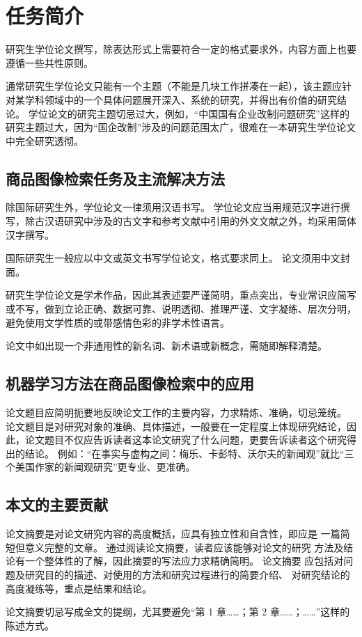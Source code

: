 
\chapter{任务简介}

研究生学位论文撰写，除表达形式上需要符合一定的格式要求外，内容方面上也要遵循一些共性原则。

通常研究生学位论文只能有一个主题（不能是几块工作拼凑在一起），该主题应针对某学科领域中的一个具体问题展开深入、系统的研究，并得出有价值的研究结论。
学位论文的研究主题切忌过大，例如，“中国国有企业改制问题研究”这样的研究主题过大，因为“国企改制”涉及的问题范围太广，很难在一本研究生学位论文中完全研究透彻。



\section{商品图像检索任务及主流解决方法}

除国际研究生外，学位论文一律须用汉语书写。
学位论文应当用规范汉字进行撰写，除古汉语研究中涉及的古文字和参考文献中引用的外文文献之外，均采用简体汉字撰写。

国际研究生一般应以中文或英文书写学位论文，格式要求同上。
论文须用中文封面。

研究生学位论文是学术作品，因此其表述要严谨简明，重点突出，专业常识应简写或不写，做到立论正确、数据可靠、说明透彻、推理严谨、文字凝练、层次分明，避免使用文学性质的或带感情色彩的非学术性语言。

论文中如出现一个非通用性的新名词、新术语或新概念，需随即解释清楚。



\section{机器学习方法在商品图像检索中的应用}

论文题目应简明扼要地反映论文工作的主要内容，力求精炼、准确，切忌笼统。
论文题目是对研究对象的准确、具体描述，一般要在一定程度上体现研究结论，因此，论文题目不仅应告诉读者这本论文研究了什么问题，更要告诉读者这个研究得出的结论。
例如：“在事实与虚构之间：梅乐、卡彭特、沃尔夫的新闻观”就比“三个美国作家的新闻观研究”更专业、更准确。



\section{本文的主要贡献}

论文摘要是对论文研究内容的高度概括，应具有独立性和自含性，即应是 一篇简短但意义完整的文章。
通过阅读论文摘要，读者应该能够对论文的研究 方法及结论有一个整体性的了解，因此摘要的写法应力求精确简明。
论文摘要 应包括对问题及研究目的的描述、对使用的方法和研究过程进行的简要介绍、 对研究结论的高度凝练等，重点是结果和结论。

论文摘要切忌写成全文的提纲，尤其要避免“第 1 章……；第 2 章……；……”这样的陈述方式。
